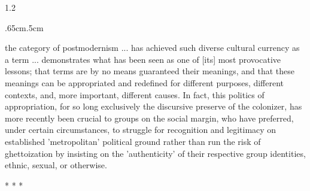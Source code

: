 \documentclass[../unravbook.tex]{subfiles}
\begin{document}
\begin{spacing}{1.2}
\begin{adjustwidth}{.65cm}{.5cm}
    \begin{singlespace}
         the category of postmodernism  ... has achieved such diverse cultural currency as a term ... demonstrates what has been seen as one of [its] most provocative lessons; that terms are by no means guaranteed their meanings, and that these meanings can be appropriated and redefined for different purposes, different contexts, and, more important, different causes. In fact, this politics of appropriation, for so long exclusively the discursive preserve of the colonizer, has more recently been crucial to groups on the social margin, who have preferred, under certain circumstances, to struggle for recognition and legitimacy on established 'metropolitan' political ground rather than run the risk of ghettoization by insisting on the 'authenticity' of their respective group identities, ethnic, sexual, or otherwise.
    \end{singlespace}
\end{adjustwidth}

\begin{center}
    *\hspace{15pt} *\hspace{15pt} *
  \end{center}


\end{spacing}
\end{document}

